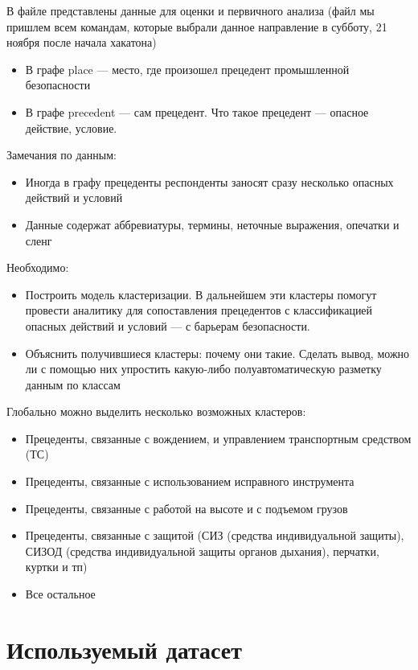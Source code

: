 \documentclass{article}
\begin{document}
В файле представлены данные для оценки и первичного анализа (файл мы пришлем всем командам, которые выбрали данное направление в субботу, 21 ноября после начала хакатона)
\begin{itemize}
    \item В графе place — место, где произошел прецедент промышленной безопасности
    \item В графе precedent — сам прецедент. Что такое прецедент — опасное действие, условие.
\end{itemize}

Замечания по данным:
\begin{itemize}
    \item Иногда в графу прецеденты респонденты заносят сразу несколько опасных действий и условий
    \item Данные содержат аббревиатуры, термины, неточные выражения, опечатки и сленг
\end{itemize}

Необходимо:
\begin{itemize}
    \item Построить модель кластеризации. В дальнейшем эти кластеры помогут провести аналитику для сопоставления прецедентов с классификацией опасных действий и условий — с барьерам безопасности.
    \item Объяснить получившиеся кластеры: почему они такие. Сделать вывод, можно ли с помощью них упростить какую-либо полуавтоматическую разметку данным по классам
\end{itemize}

Глобально можно выделить несколько возможных кластеров:
\begin{itemize}
    \item Прецеденты, связанные с вождением, и управлением транспортным средством (ТС)
    \item Прецеденты, связанные с использованием исправного инструмента
    \item Прецеденты, связанные с работой на высоте и с подъемом грузов
    \item Прецеденты, связанные с защитой (СИЗ (средства индивидуальной защиты), СИЗОД (средства индивидуальной защиты органов дыхания), перчатки, куртки и тп)
    \item Все остальное
\end{itemize}

\section{Используемый датасет}
\end{document}
